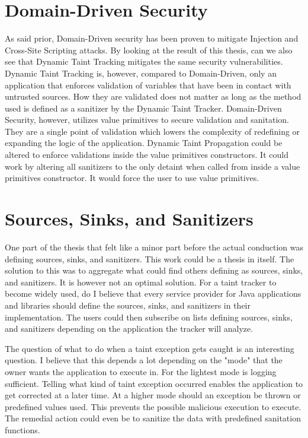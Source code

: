 \section{Domain-Driven Security}
\label{security}
As said prior, Domain-Driven security has been proven to mitigate Injection and Cross-Site Scripting attacks. By looking at the result of this thesis, can we also see that Dynamic Taint Tracking mitigates the same security vulnerabilities. Dynamic Taint Tracking is, however, compared to Domain-Driven, only an application that enforces validation of variables that have been in contact with untrusted sources. How they are validated does not matter as long as the method used is defined as a sanitizer by the Dynamic Taint Tracker. Domain-Driven Security, however, utilizes value primitives to secure validation and sanitation. They are a single point of validation which lowers the complexity of redefining or expanding the logic of the application. Dynamic Taint Propagation could be altered to enforce validations inside the value primitives constructors. It could work by altering all sanitizers to the only detaint when called from inside a value primitives constructor. It would force the user to use value primitives.



\section{Sources, Sinks, and Sanitizers}
\label{sss}
One part of the thesis that felt like a minor part before the actual conduction was defining sources, sinks, and sanitizers. This work could be a thesis in itself. The solution to this was to aggregate what could find others defining as sources, sinks, and sanitizers. It is however not an optimal solution. For a taint tracker to become widely used, do I believe that every service provider for Java applications and libraries should define the sources, sinks, and sanitizers in their implementation. The users could then subscribe on lists defining sources, sinks, and sanitizers depending on the application the tracker will analyze.

The question of what to do when a taint exception gets caught is an interesting question. I believe that this depends a lot depending on the "mode" that the owner wants the application to execute in. For the lightest mode is logging sufficient. Telling what kind of taint exception occurred enables the application to get corrected at a later time. At a higher mode should an exception be thrown or predefined values used. This prevents the possible malicious execution to execute. The remedial action could even be to sanitize the data with predefined sanitation functions. 



